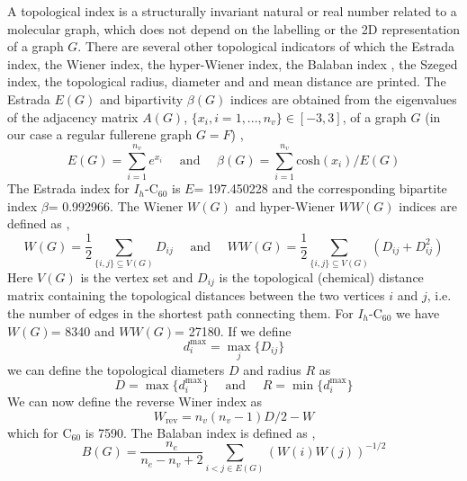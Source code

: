 \documentclass[article,a4paper,twoside]{memoir}
\newcommand{\C}[1]{\ensuremath{\mathrm{C}_{#1}}}
\begin{document}
A topological index is a structurally invariant natural or real number related to a molecular graph, which does not depend on the labelling 
or the 2D representation of a graph $G$. There are several other topological indicators \cite{Cataldo,Caporossi} of which the Estrada 
index, the Wiener index, the hyper-Wiener index, the Balaban index , the Szeged index, the topological radius, diameter and and mean distance
are printed. The Estrada $E(G)$ and bipartivity $\beta(G)$ indices are obtained from the eigenvalues of the adjacency
matrix $A(G)$, $\{ x_i, i=1,...,n_v \} \in [-3,3]$, of a graph $G$ (in our case a regular fullerene graph $G=F$) \cite{Estrada,Doslic2005},
\begin{equation}
  \label{Estrada}
  E(G)=\sum_{i=1}^{n_v}e^{x_i} \quad \text{ and } \quad \beta(G)=\sum_{i=1}^{n_v}\text{cosh}(x_i)/E(G)
\end{equation}
The Estrada index for $I_h$-\C{60} is $E$= 197.450228 and the corresponding bipartite index $\beta$= 0.992966. The Wiener $W(G)$ and hyper-Wiener $WW(G)$ 
indices are defined as \cite{Wiener1947},
\begin{equation}
  \label{Wiener}
  W(G)=\frac{1}{2} \sum_{\{ i,j \} \subseteq V(G)} D_{ij} \quad \text{ and } \quad WW(G)=\frac{1}{2} \sum_{\{ i,j \} \subseteq V(G)} \left( D_{ij} + D_{ij}^2 \right)
\end{equation}
Here $V(G)$ is the vertex set and $D_{ij}$ is the topological (chemical) distance matrix containing the topological distances 
between the two vertices $i$ and $j$, i.e. the number of edges in the shortest path connecting them. 
For $I_h$-\C{60} we have $W(G)$= 8340 and $WW(G)$= 27180. If we define
\begin{equation}
  \label{TopDist}
  d_i^{\mathrm{max}} = \max\limits_{j} \{ D_{ij} \}
\end{equation}
we can define the topological diameters $D$ and radius $R$ as\cite{Caporossi}
\begin{equation}
  \label{TopDist}
  D = \max \{ d_i^{\mathrm{max}} \} \quad \text{ and } \quad  R = \min \{ d_i^{\mathrm{max}} \}
\end{equation}
We can now define the reverse Winer index\cite{Balaban2000} as
\begin{equation}
  \label{RevWiener}
  W_{\mathrm{rev}} = n_v(n_v - 1)D/2 - W
\end{equation}
which for \C{60} is 7590. The Balaban index is defined as \cite{Balaban},
\begin{equation}
  \label{Balaban}
  B(G)=\frac{n_e}{n_e-n_v+2} \sum_{i<j \in E(G)} \left( W(i)W(j) \right)^{-1/2}
\end{equation}
\end{document}
